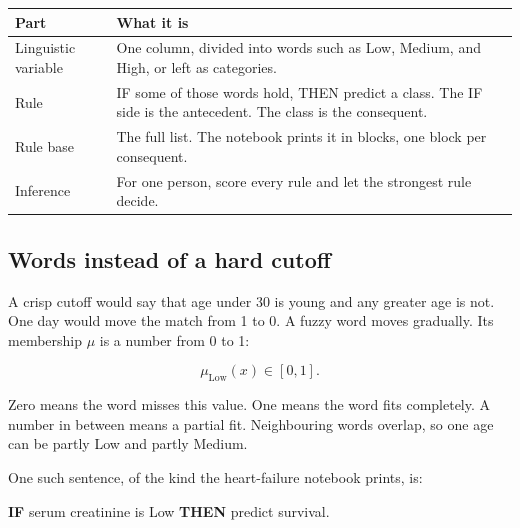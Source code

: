 \documentclass[11pt]{article}
\begin{document}
\begin{table}[H]
\centering
\small
\begin{tabularx}{\textwidth}{@{}l Y@{}}
\toprule
Part & What it is \\
\midrule
Linguistic variable & One column, divided into words such as Low, Medium, and High, or left as categories. \\
Rule & IF some of those words hold, THEN predict a class. The IF side is the antecedent. The class is the consequent. \\
Rule base & The full list. The notebook prints it in blocks, one block per consequent. \\
Inference & For one person, score every rule and let the strongest rule decide. \\
\bottomrule
\end{tabularx}
\end{table}

\subsection{Words instead of a hard cutoff}

A crisp cutoff would say that age under 30 is young and any greater age is not. One day would move the match from 1 to 0. A fuzzy word moves gradually. Its membership \(\mu\) is a number from 0 to 1:

\[
\mu_{\mathrm{Low}}(x) \in [0, 1].
\]

Zero means the word misses this value. One means the word fits completely. A number in between means a partial fit. Neighbouring words overlap, so one age can be partly Low and partly Medium.

One such sentence, of the kind the heart-failure notebook prints, is:

\begin{center}
{\sffamily\bfseries IF} serum creatinine is Low \textbf{THEN} predict survival.
\end{center}
\end{document}
